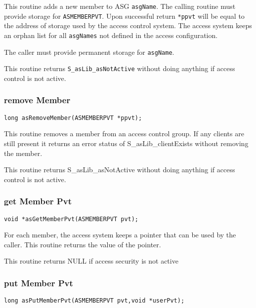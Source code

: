 This routine adds a new member to ASG \verb|asgName|. The calling routine must provide storage for \verb|ASMEMBERPVT|. Upon 
successful return \verb|*ppvt| will be equal to the address of storage used by the access control system. The access system 
keeps an orphan list for all \verb|asgNames| not defined in the access configuration.

The caller must provide permanent storage for \verb|asgName|.

This routine returns \verb|S_asLib_asNotActive| without doing anything if access control is not active.

\subsubsection{remove Member}

\begin{verbatim}
long asRemoveMember(ASMEMBERPVT *ppvt);
\end{verbatim}

This routine removes a member from an access control group. If any clients are still present it returns an error status of 
S\_asLib\_clientExists without removing the member.

This routine returns S\_asLib\_asNotActive without doing anything if access control is not active.

\subsubsection{get Member Pvt}

\begin{verbatim}
void *asGetMemberPvt(ASMEMBERPVT pvt);
\end{verbatim}

For each member, the access system keeps a pointer that can be used by the caller. This routine returns the value of the 
pointer.

This routine returns NULL if access security is not active 

\subsubsection{put Member Pvt}

\begin{verbatim}
long asPutMemberPvt(ASMEMBERPVT pvt,void *userPvt);
\end{verbatim}

